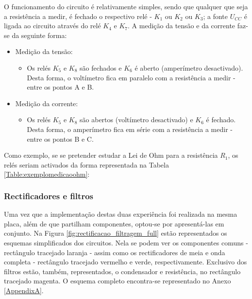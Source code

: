 O funcionamento do circuito é relativamente simples, sendo que qualquer que seja a resistência a medir, é fechado o respectivo relé - $K_{1}$ ou $K_{2}$ ou $K_{3}$; a fonte $U_{CC}$ é ligada ao circuito através do relé $K_{4}$ e $K_{7}$. A medição da tensão e da corrente faz-se da seguinte forma:

\begin{itemize}
	\item Medição da tensão:
	      \begin{itemize}
		      \item Os relés $K_{5}$ e $K_{8}$ são fechados e $K_{6}$ é aberto (amperímetro desactivado). Desta forma, o voltímetro fica em paralelo com a resistência a medir - entre os pontos A e B.
	      \end{itemize}
	\item Medição da corrente:
	      \begin{itemize}
		      \item Os relés $K_{5}$ e $K_{8}$ são abertos (voltímetro desactivado) e $K_{6}$ é fechado. Desta forma, o amperímetro fica em série com a resistência a medir - entre os pontos B e C.
	      \end{itemize}
\end{itemize}

Como exemplo, se se pretender estudar a Lei de Ohm para a resistência $R_{1}$, os relés seriam activados da forma representada na Tabela \ref{Table:exemplomedicaoohm}:

\subsubsection{Rectificadores e filtros}
\label{sec:rectificadoresfiltros}
Uma vez que a implementação destas duas experiência foi realizada na mesma placa, além de que partilham componentes, optou-se por apresentá-las em conjunto. Na Figura \ref{fig:rectificacao_filtragem_full} estão representados os esquemas simplificados dos circuitos. Nela se podem ver os componentes comuns - rectângulo tracejado laranja - assim como os rectificadores de meia e onda completa - rectângulo tracejado vermelho e verde, respectivamente. Exclusivo dos filtros estão, também, representados, o condensador e resistência, no rectângulo tracejado magenta. O esquema completo encontra-se representado no Anexo \ref{AppendixA}.

